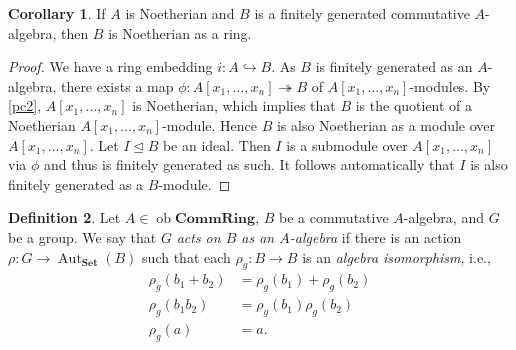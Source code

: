 \documentclass[10pt,letterpaper,cm]{nupset}
\theoremstyle{definition}
\newtheorem{definition}{Definition}[subsection]
\theoremstyle{theorem}
\newtheorem{corollary}[definition]{Corollary}
\theoremstyle{remark}
\newcommand{\1}{\mathbf{1}}
\newcommand{\0}{\vec 0}
\DeclareMathOperator{\aut}{Aut}
\DeclareMathOperator{\ob}{ob}
\begin{document}
\begin{corollary}
If $A$ is Noetherian and $B$ is a finitely generated commutative $A$-algebra, then $B$ is Noetherian as a ring.
\end{corollary}
\begin{proof}
We have a ring embedding $i: A \hookrightarrow B$. As $B$ is finitely generated as an $A$-algebra, there exists a map $\phi: A\left[x_1, \ldots, x_n\right] \twoheadrightarrow B$ of $A\left[x_1, \ldots, x_n\right]$-modules. By \cref{pc2}, $A\left[x_1, \ldots, x_n\right]$ is Noetherian, which implies that $B$ is the quotient of a Noetherian $A\left[x_1, \ldots, x_n\right]$-module. Hence $B$ is also Noetherian as a module over $A\left[x_1, \ldots, x_n\right]$. Let $I\unlhd B$ be an ideal. Then $I$ is a submodule over $A\left[x_1, \ldots, x_n\right]$ via $\phi$ and thus is finitely generated as such. It follows automatically that $I$ is also finitely generated as a $B$-module.
\end{proof}

\bigskip

\begin{definition}
Let $A \in \ob \mathbf{CommRing}$, $B$ be a commutative $A$-algebra, and $G$ be a group. We say that $G$ \textit{acts on $B$ as an $A$-algebra} if there is an action $\rho : G \to \aut_{\mathbf{Set}}(B)$ such that each  $\rho_g  : B \to B$ is an \textit{algebra isomorphism}, i.e., 
\begin{align*}
  \rho_g(b_1 +b_2) & = \rho_g(b_1) + \rho_g(b_2)
\\  \rho_g(b_1b_2) & = \rho_g(b_1)\rho_g(b_2)
\\  \rho_g(a) & = a
.\end{align*}
\end{definition}
\end{document}
